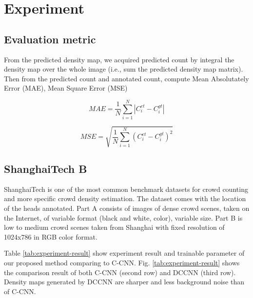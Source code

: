 \section{Experiment}

\subsection{Evaluation metric}


From the predicted density map, we acquired predicted count by integral the density map over the whole image (i.e., sum the predicted density map matrix). Then from the predicted count and annotated count, compute Mean Absolutately Error (MAE), Mean Square Error (MSE) 

\begin{equation}M A E=\frac{1}{N} \sum_{i=1}^{N}\left|C_{i}^{e t}-C_{i}^{g t}\right|\end{equation}

\begin{equation}M S E=\sqrt{\frac{1}{N} \sum_{i=1}^{N}\left(C_{i}^{e t}-C_{i}^{g t}\right)^{2}}\end{equation}

\subsection{ShanghaiTech B} \label{sec:shb_result}
 


ShanghaiTech \cite{zhang2016single} is one of the most common benchmark datasets for crowd counting and more specific crowd density estimation. The dataset comes with the location of the heads annotated. Part A consists of images of dense crowd scenes, taken on the Internet, of variable format (black and white, color), variable size. Part B is low to medium crowd scenes taken from Shanghai with fixed resolution of 1024x786 in RGB color format. 

Table \ref{tab:experiment-result} show experiment result and trainable parameter of our proposed method comparing to C-CNN. Fig. \ref{tab:experiment-result} shows the comparison result of both C-CNN (second row) and DCCNN (third row). Density maps generated by DCCNN are sharper and less background noise than of C-CNN.


